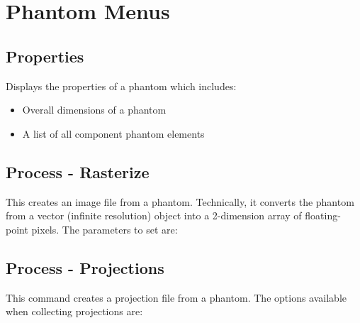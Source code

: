 \section{Phantom Menus}

\subsection{Properties}
Displays the properties of a phantom which includes:

\begin{itemize}\itemsep=0pt
\item Overall dimensions of a phantom
\item A list of all component phantom elements
\end{itemize}

\subsection{Process - Rasterize}\label{IDH_DLG_RASTERIZE}
This creates an image file from a phantom. Technically, it
converts the phantom from a vector (infinite resolution) object
into a 2-dimension array of floating-point pixels. The parameters
to set are:

\begin{twocollist}
\end{twocollist}

\subsection{Process - Projections}\label{IDH_DLG_PROJECTIONS}
This command creates a projection file from a phantom. The options
available when collecting projections are:

